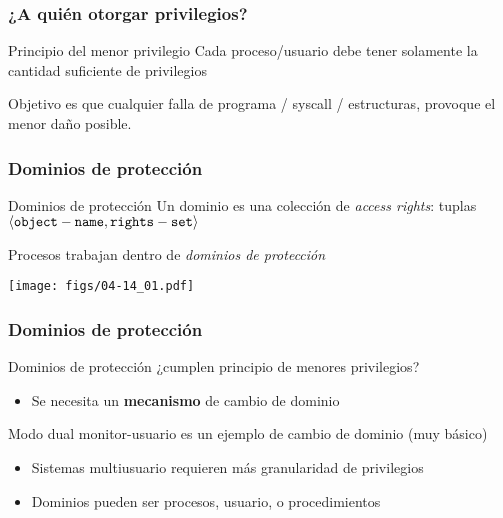 \documentclass[letter]{beamer}
\begin{document}


\begin{frame}
  \frametitle{¿A quién otorgar privilegios?}

  \begin{alertblock}{Principio del menor privilegio}
    Cada proceso/usuario debe tener solamente la cantidad suficiente
    de privilegios
  \end{alertblock}

  Objetivo es que cualquier falla de programa / syscall / estructuras,
  provoque el menor daño posible.

\end{frame}

\begin{frame}
  \frametitle{Dominios de protección}

  \begin{block}{Dominios de protección}
    Un dominio es una colección de {\em access rights}: 
    tuplas $\langle {\tt object-name}, {\tt rights-set}  \rangle$
  \end{block}

  Procesos trabajan dentro de {\em dominios de protección}

  \begin{center}
    \texttt{[image: figs/04-14\_01.pdf]}
  \end{center}

\end{frame}


\begin{frame}
  \frametitle{Dominios de protección}

  Dominios de protección ¿cumplen principio de menores privilegios?
  
  \begin{itemize}
    \item Se necesita un {\bf mecanismo} de cambio de dominio
  \end{itemize}
  
  Modo dual monitor-usuario es un ejemplo de cambio de dominio (muy básico)
  \begin{itemize}
    \item Sistemas multiusuario requieren más granularidad de privilegios
    \item Dominios pueden ser procesos, usuario, o procedimientos
  \end{itemize}

\end{frame}
\end{document}
